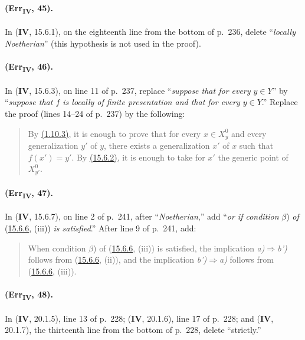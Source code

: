 {\paragraph{(Err\textsubscript{\textmd{IV}}, 45).}
In (\textbf{IV}, 15.6.1), on the eighteenth line from the bottom of p.~236,
delete ``\emph{locally Noetherian}'' (this hypothesis is not used in the
proof).

\paragraph{(Err\textsubscript{\textmd{IV}}, 46).}
In (\textbf{IV}, 15.6.3), on line 11 of p.~237, replace ``\emph{suppose that for every
$y\in Y$}'' by ``\emph{suppose that $f$ is locally of finite presentation and
that for every $y\in Y$}.''  Replace the proof (lines 14--24 of p.~237)
by the following:

\begin{quote}
By {\hyperref[subsection:IV.1.10]{(1.10.3)}}, it is enough to prove that for every $x\in X_y^0$ and
every generalization $y'$ of $y$, there exists a generalization $x'$ of
$x$ such that $f(x')=y'$.  By {\hyperref[IV.15.6.2]{(15.6.2)}}, it is enough to take for $x'$
the generic point of $X_{y'}^0$.
\end{quote}

\paragraph{(Err\textsubscript{\textmd{IV}}, 47).}
In (\textbf{IV}, 15.6.7), on line 2 of p.~241, after ``\emph{Noetherian},'' add ``\emph{or if
condition} $\beta$) \emph{of} ({\hyperref[IV.15.6.6]{15.6.6}}, (iii)) \emph{is satisfied}.''  After line 9 of
p.~241, add:
\begin{quote}
When condition $\beta$) of ({\hyperref[IV.15.6.6]{15.6.6}}, (iii)) is satisfied, the implication
\emph{a)}$\Rightarrow$\emph{b')} follows from ({\hyperref[IV.15.6.6]{15.6.6}}, (ii)), and the implication
\emph{b')}$\Rightarrow$\emph{a)} follows from ({\hyperref[IV.15.6.6]{15.6.6}}, (iii)).
\end{quote}

\paragraph{(Err\textsubscript{\textmd{IV}}, 48).}
In (\textbf{IV}, 20.1.5), line 13 of p.~228; (\textbf{IV}, 20.1.6), line 17 of p.~228;
and (\textbf{IV}, 20.1.7), the thirteenth line from the bottom of p.~228, delete
``strictly.''

}

